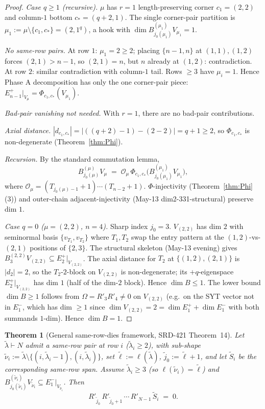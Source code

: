 \documentclass[11pt]{article}
\newtheorem{theorem}{Theorem}
\theoremstyle{definition}
\begin{document}
\begin{proof}
\emph{Case $q \ge 1$ (recursive).} $\mu$ has $r = 1$ length-preserving
corner $c_1 = (2, 2)$ and column-$1$ bottom $c_* = (q + 2, 1)$. The
single corner-pair partition is $\mu_1 := \mu \setminus \{c_1, c_*\}
= (2, 1^q)$, a hook with $\dim B^{(\mu_1)}_{j_0(\mu_1)} V_{\mu_1} = 1$.

\emph{No same-row pairs.} At row $1$: $\mu_1 = 2 \ge 2$; placing
$\{n-1, n\}$ at $(1, 1), (1, 2)$ forces $(2, 1) > n - 1$, so $(2, 1)
= n$, but $n$ already at $(1, 2)$: contradiction. At row $2$: similar
contradiction with column-$1$ tail. Rows $\ge 3$ have $\mu_i = 1$.
Hence Phase A decomposition has only the one corner-pair piece:
$E_{n-1}^+|_{V_\mu} = \Phi_{c_1, c_*}(V_{\mu_1})$.

\emph{Bad-pair vanishing not needed.} With $r = 1$, there are no
bad-pair contributions.

\emph{Axial distance.} $|d_{c_1, c_*}| = |((q+2) - 1) - (2 - 2)| = q + 1
\ge 2$, so $\Phi_{c_1, c_*}$ is non-degenerate
(Theorem~\ref{thm:Phi}).

\emph{Recursion.} By the standard commutation lemma,
\[
   B^{(\mu)}_{j_0(\mu)} V_\mu
   \;=\; \mathcal{O}_\mu\, \Phi_{c_1, c_*}\!\big(B^{(\mu_1)}_{j_0(\mu_1)}
   V_{\mu_1}\big),
\]
where $\mathcal{O}_\mu = (T_{j_0(\mu) - 1}{+}1)\cdots(T_{n-2}{+}1)$.
$\Phi$-injectivity (Theorem~\ref{thm:Phi}(3)) and outer-chain
adjacent-injectivity (May-13 dim2-331-structural) preserve dim $1$.

\emph{Case $q = 0$ ($\mu = (2, 2)$, $n = 4$).} Sharp index $j_0 = 3$.
$V_{(2, 2)}$ has dim $2$ with seminormal basis $\{v_{T_1}, v_{T_2}\}$
where $T_1, T_2$ swap the entry pattern at the $(1, 2)$-vs-$(2, 1)$
positions of $\{2, 3\}$. The structural skeleton (May-13 evening) gives
$B^{(2, 2)}_3 V_{(2, 2)} \subseteq E_2^+|_{V_{(2, 2)}}$. The axial
distance for $T_2$ at $\{(1, 2), (2, 1)\}$ is $|d_2| = 2$, so the
$T_2$-$2$-block on $V_{(2, 2)}$ is non-degenerate; its $+q$-eigenspace
$E_2^+|_{V_{(2, 2)}}$ has dim $1$ (half of the dim-$2$ block).
Hence $\dim B \le 1$. The lower bound $\dim B \ge 1$ follows from
$\Omega = R'_3 R'_4 \ne 0$ on $V_{(2, 2)}$ (e.g.\ on
the SYT vector not in $E_1^-$, which has dim $\ge 1$ since
$\dim V_{(2, 2)} = 2 = \dim E_1^+ + \dim E_1^-$ with both summands
$1$-dim). Hence $\dim B = 1$.
\end{proof}

\begin{theorem}[General same-row-dies framework, SRD-421 Theorem~14]\label{thm:srd}
Let $\widetilde\lambda \vdash N$ admit a same-row pair at row $i$
($\widetilde\lambda_i \ge 2$), with sub-shape
$\widetilde\nu_i := \widetilde\lambda \setminus \{(i, \widetilde\lambda_i - 1),
(i, \widetilde\lambda_i)\}$, set $\widetilde\ell := \ell(\widetilde\lambda)$,
$\widetilde j_0 := \widetilde\ell + 1$, and let $\widetilde S_i$ be the
corresponding same-row span. Assume $\widetilde\lambda_i \ge 3$
(so $\ell(\widetilde\nu_i) = \widetilde\ell$) and
$B^{(\widetilde\nu_i)}_{j_0(\widetilde\nu_i)} V_{\widetilde\nu_i}
\subseteq E_1^-|_{V_{\widetilde\nu_i}}$. Then
\[
   R'_{\widetilde j_0}\, R'_{\widetilde j_0 + 1}\, \cdots\, R'_{N-1}
   \, \widetilde S_i \;=\; 0.
\]
\end{theorem}
\end{document}
